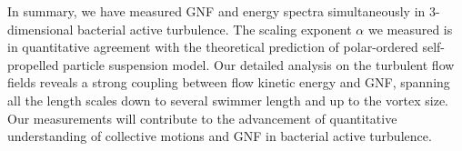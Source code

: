\documentclass[twocolumn,aps,prx,amsmath,amssymb,longbibliography]{revtex4-2}
\begin{document}
In summary, we have measured GNF and energy spectra simultaneously in 3-dimensional bacterial active turbulence. The scaling exponent $\alpha$ we measured is in quantitative agreement with the theoretical prediction of polar-ordered self-propelled particle suspension model.
Our detailed analysis on the turbulent flow fields reveals a strong coupling between flow kinetic energy and GNF, spanning all the length scales down to several swimmer length and up to the vortex size.
Our measurements will contribute to the advancement of quantitative understanding of collective motions and GNF in bacterial active turbulence.



\end{document}

